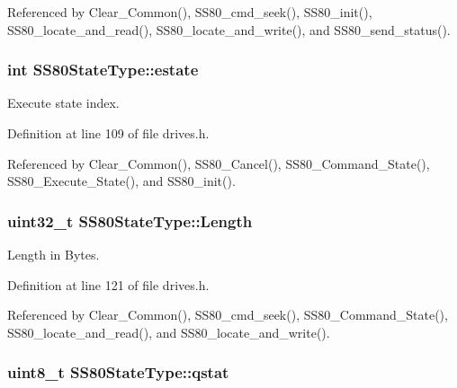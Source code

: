 Referenced by Clear\+\_\+\+Common(), S\+S80\+\_\+cmd\+\_\+seek(), S\+S80\+\_\+init(), S\+S80\+\_\+locate\+\_\+and\+\_\+read(), S\+S80\+\_\+locate\+\_\+and\+\_\+write(), and S\+S80\+\_\+send\+\_\+status().

\subsubsection[{\texorpdfstring{estate}{estate}}]{\setlength{\rightskip}{0pt plus 5cm}int S\+S80\+State\+Type\+::estate}\hypertarget{structSS80StateType_ae4a94143cb4201687be4e33684be057e}{}\label{structSS80StateType_ae4a94143cb4201687be4e33684be057e}


Execute state index. 



Definition at line 109 of file drives.\+h.



Referenced by Clear\+\_\+\+Common(), S\+S80\+\_\+\+Cancel(), S\+S80\+\_\+\+Command\+\_\+\+State(), S\+S80\+\_\+\+Execute\+\_\+\+State(), and S\+S80\+\_\+init().

\subsubsection[{\texorpdfstring{Length}{Length}}]{\setlength{\rightskip}{0pt plus 5cm}uint32\+\_\+t S\+S80\+State\+Type\+::\+Length}\hypertarget{structSS80StateType_a507159f0a0a4f3127488081fd618e8f6}{}\label{structSS80StateType_a507159f0a0a4f3127488081fd618e8f6}


Length in Bytes. 



Definition at line 121 of file drives.\+h.



Referenced by Clear\+\_\+\+Common(), S\+S80\+\_\+cmd\+\_\+seek(), S\+S80\+\_\+\+Command\+\_\+\+State(), S\+S80\+\_\+locate\+\_\+and\+\_\+read(), and S\+S80\+\_\+locate\+\_\+and\+\_\+write().

\subsubsection[{\texorpdfstring{qstat}{qstat}}]{\setlength{\rightskip}{0pt plus 5cm}uint8\+\_\+t S\+S80\+State\+Type\+::qstat}\hypertarget{structSS80StateType_ad4911c7b89ec1ff2c0aa01881b1e3d3a}{}\label{structSS80StateType_ad4911c7b89ec1ff2c0aa01881b1e3d3a}


